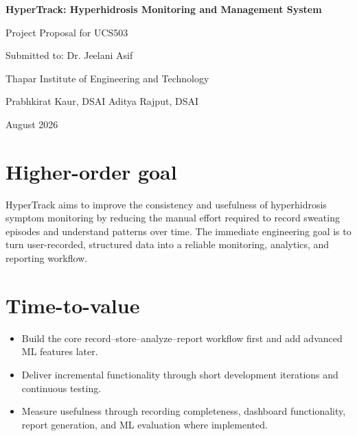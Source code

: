 \documentclass[11pt,a4paper]{article}
\begin{document}
\begin{center}
{\LARGE\bfseries HyperTrack: Hyperhidrosis Monitoring and Management System\par}
\vspace{2pt}
{\large Project Proposal for UCS503\par}
{\large Submitted to: Dr. Jeelani Asif\par}
{\large Thapar Institute of Engineering and Technology\par}
\vspace{9pt}
Prabhkirat Kaur, DSAI \hspace{1.1cm} Aditya Rajput, DSAI\par
\vspace{4pt}
{\large August 2026\par}
\end{center}

\section{Higher-order goal}

HyperTrack aims to improve the consistency and usefulness of hyperhidrosis symptom monitoring by reducing the manual effort required to record sweating episodes and understand patterns over time. The immediate engineering goal is to turn user-recorded, structured data into a reliable monitoring, analytics, and reporting workflow.

\begin{center}
\end{center}


\section{Time-to-value}

\begin{itemize}
\item Build the core record--store--analyze--report workflow first and add advanced ML features later.
\item Deliver incremental functionality through short development iterations and continuous testing.
\item Measure usefulness through recording completeness, dashboard functionality, report generation, and ML evaluation where implemented.
\end{itemize}
\end{document}
